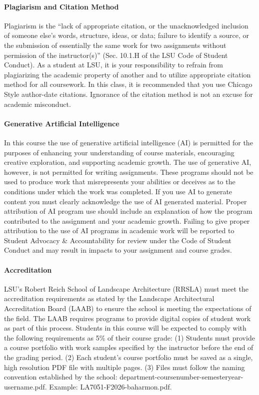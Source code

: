 \documentclass[11pt,article,oneside]{memoir}
\begin{document}
\paragraph{Plagiarism and Citation Method}
Plagiarism is the 
``lack of appropriate citation, or the unacknowledged inclusion 
of someone else's words, structure, ideas, or data; 
failure to identify a source, 
or the submission of essentially the same work 
for two assignments without permission of the instructor(s)'' 
(Sec. 10.1.H of the LSU Code of Student Conduct). 
As a student at LSU, 
it is your responsibility to refrain from 
plagiarizing the academic property of another 
and to utilize appropriate citation method for all coursework. 
In this class, it is recommended that you use 
Chicago Style author-date citations. 
Ignorance of the citation method
is not an excuse for academic misconduct.

\paragraph{Generative Artificial Intelligence}
In this course the use of generative artificial intelligence (AI) 
is permitted for the purposes of enhancing your understanding 
of course materials, encouraging creative exploration, 
and supporting academic growth. 
The use of generative AI, however, 
is not permitted for writing assignments. 
These programs should not be used to produce work 
that misrepresents your abilities 
or deceives as to the conditions 
under which the work was completed. 
If you use AI to generate content 
you must clearly acknowledge the use of AI generated material. 
Proper attribution of AI program use
should include an explanation of how the program 
contributed to the assignment and your academic growth. 
Failing to give proper attribution 
to the use of AI programs in academic work
will be reported to Student Advocacy \& Accountability 
for review under the Code of Student Conduct 
and may result in impacts to your assignment and course grades.

\paragraph{Accreditation}
LSU's Robert Reich School of Landscape Architecture (RRSLA) 
must meet the accreditation requirements 
as stated by the Landscape Architectural Accreditation
Board (LAAB) to ensure the school
 is meeting the expectations of the field. 
The LAAB requires programs to provide digital copies 
of student work as part of this process.
Students in this course will be expected 
to comply with the following requirements
as 5\% of their course grade: 
(1) Students must provide a course portfolio
with work samples specified by the instructor 
before the end of the grading period. 
(2) Each student's course portfolio must be saved as 
a single, high resolution PDF file with multiple pages. 
(3) Files must follow the naming convention
established by the school: 
department-coursenumber-semesteryear-username.pdf.
Example: LA7051-F2026-baharmon.pdf.
\end{document}
